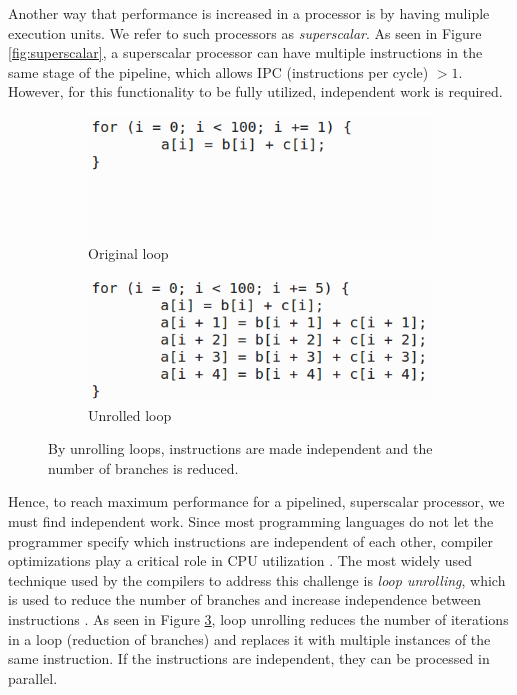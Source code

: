 Another way that performance is increased in a processor is by having muliple execution units. We refer to such processors as \textit{superscalar}. As seen in Figure \ref{fig:superscalar}, a superscalar processor can have multiple instructions in the same stage of the pipeline, which allows IPC (instructions per cycle) $> 1$. However, for this functionality to be fully utilized, independent work is required.

\begin{figure}
  \centering
  \begin{subfigure}{0.45\textwidth}
    \includegraphics[width=\textwidth]{img/loop-unrolling-1.png}
    \caption{Original loop}
    \label{fig:loop-unrolling-1} 
  \end{subfigure}
  \begin{subfigure}{0.45\textwidth}
    \includegraphics[width=\textwidth]{img/loop-unrolling-2.png}
    \caption{Unrolled loop}
    \label{fig:loop-unrolling-2} 
  \end{subfigure}
  \caption{By unrolling loops, instructions are made independent and the number of branches is reduced.}
  \label{fig:loop-unrolling} 
\end{figure}
Hence, to reach maximum performance for a pipelined, superscalar processor, we must find independent work. Since most programming languages do not let the programmer specify which instructions are independent of each other, compiler optimizations play a critical role in CPU utilization \cite{Boncz2005-wj}. The most widely used technique used by the compilers to address this challenge is \textit{loop unrolling}, which is used to reduce the number of branches and increase independence between instructions \cite{Wikipedia_contributors2015-zc}. As seen in Figure \ref{fig:loop-unrolling}, loop unrolling reduces the number of iterations in a loop (reduction of branches) and replaces it with multiple instances of the same instruction. If the instructions are independent, they can be processed in parallel.

